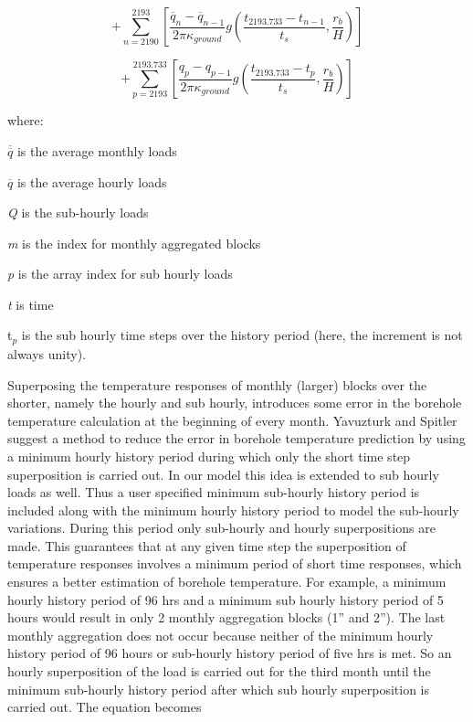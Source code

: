 \begin{equation}
+ \sum\limits_{n = 2190}^{2193} {\left[ {\frac{{{{\overline q }_n} - {{\overline q }_{n - 1}}}}{{2\pi {\kappa_{ground}}}}g\left( {\frac{{{t_{2193.733}} - {t_{n - 1}}}}{{{t_s}}},\frac{{{r_b}}}{H}} \right)} \right]}
\end{equation}

\begin{equation}
+ \sum\limits_{p = 2193}^{2193.733} {\left[ {\frac{{{q_p} - {q_{p - 1}}}}{{2\pi {\kappa_{ground}}}}g\left( {\frac{{{t_{2193.733}} - {t_p}}}{{{t_s}}},\frac{{{r_b}}}{H}} \right)} \right]}
\end{equation}

where:

\(\overline{\overline q}\) is the average monthly loads

\(\overline q\) is the average hourly loads

\emph{Q} is the sub-hourly loads

\emph{m} is the index for monthly aggregated blocks

\emph{p} is the array index for sub hourly loads

\emph{t} is time

t\(_{p}\) is the sub hourly time steps over the history period (here, the increment is not always unity).

Superposing the temperature responses of monthly (larger) blocks over the shorter, namely the hourly and sub hourly, introduces some error in the borehole temperature calculation at the beginning of every month. Yavuzturk and Spitler suggest a method to reduce the error in borehole temperature prediction by using a minimum hourly history period during which only the short time step superposition is carried out. In our model this idea is extended to sub hourly loads as well. Thus a user specified minimum sub-hourly history period is included along with the minimum hourly history period to model the sub-hourly variations. During this period only sub-hourly and hourly superpositions are made. This guarantees that at any given time step the superposition of temperature responses involves a minimum period of short time responses, which ensures a better estimation of borehole temperature. For example, a minimum hourly history period of 96 hrs and a minimum sub hourly history period of 5 hours would result in only 2 monthly aggregation blocks (1'' and 2''). The last monthly aggregation does not occur because neither of the minimum hourly history period of 96 hours or sub-hourly history period of five hrs is met. So an hourly superposition of the load is carried out for the third month until the minimum sub-hourly history period after which sub hourly superposition is carried out. The equation becomes

